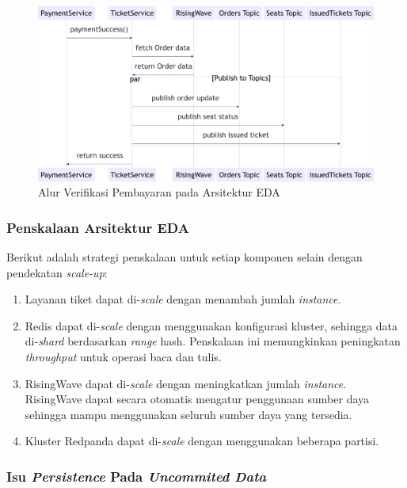 \begin{figure}[htbp]
    \centering
    \includegraphics[width=1\textwidth]{resources/appendix/eda-verify-payment.png}
    \caption{Alur Verifikasi Pembayaran pada Arsitektur EDA}
    \label{fig:payment-verify-flow-eda}
\end{figure}

\subsubsection{Penskalaan Arsitektur EDA}

Berikut adalah strategi penskalaan untuk setiap komponen selain dengan pendekatan \textit{scale-up}:

\begin{enumerate}
    \item Layanan tiket dapat di-\textit{scale} dengan menambah jumlah \textit{instance}.
    \item Redis dapat di-\textit{scale} dengan menggunakan konfigurasi kluster, sehingga data di-\textit{shard} berdasarkan \textit{range} hash. Penskalaan ini memungkinkan peningkatan \textit{throughput} untuk operasi baca dan tulis.
    \item  RisingWave dapat di-\textit{scale} dengan meningkatkan jumlah \textit{instance}. RisingWave dapat secara otomatis mengatur penggunaan sumber daya sehingga mampu menggunakan seluruh sumber daya yang tersedia.
    \item Kluster Redpanda dapat di-\textit{scale} dengan menggunakan beberapa partisi.
\end{enumerate}

\subsubsection{Isu \textit{Persistence} Pada \textit{Uncommited Data}}

